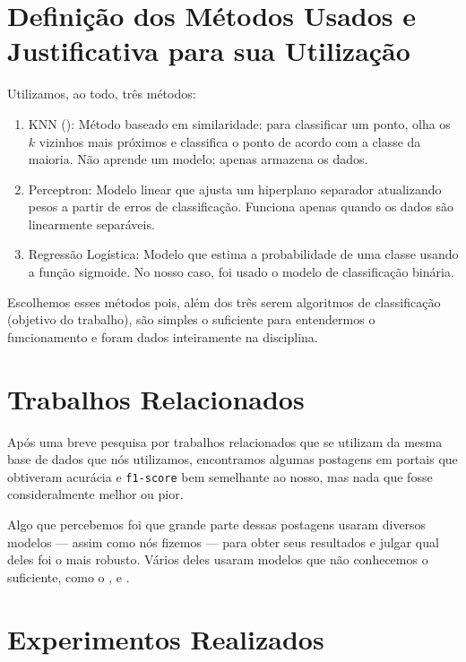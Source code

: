 \section{Definição dos Métodos Usados e Justificativa para sua Utilização}

  Utilizamos, ao todo, três métodos:
  \begin{enumerate}
    \item KNN (): Método baseado em similaridade: para classificar um ponto, olha os $k$ vizinhos mais próximos e classifica o ponto de acordo com a classe da maioria. Não aprende um modelo; apenas armazena os dados.

    \item Perceptron: Modelo linear que ajusta um hiperplano separador atualizando pesos a partir de erros de classificação. Funciona apenas quando os dados são linearmente separáveis.

    \item Regressão Logística: Modelo que estima a probabilidade de uma classe usando a função sigmoide. No nosso caso, foi usado o modelo de classificação binária.
  \end{enumerate}

  Escolhemos esses métodos pois, além dos três serem algoritmos de classificação (objetivo do trabalho), são simples o suficiente para entendermos o funcionamento e foram dados inteiramente na disciplina.


\section{Trabalhos Relacionados}

  Após uma breve pesquisa por trabalhos relacionados que se utilizam da mesma base de dados que nós utilizamos, encontramos algumas postagens em portais  que obtiveram acurácia e \texttt{f1-score} bem semelhante ao nosso, mas nada que fosse consideralmente melhor ou pior.

  Algo que percebemos foi que grande parte dessas postagens usaram diversos modelos --- assim como nós fizemos --- para obter seus resultados e julgar qual deles foi o mais robusto. Vários deles usaram modelos que não conhecemos o suficiente, como o ,  e .


\section{Experimentos Realizados}

